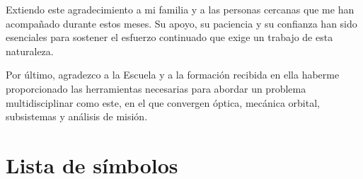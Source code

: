 Extiendo este agradecimiento a mi familia y a las personas cercanas que me han acompañado durante estos meses. Su apoyo, su paciencia y su confianza han sido esenciales para sostener el esfuerzo continuado que exige un trabajo de esta naturaleza.

Por último, agradezco a la Escuela y a la formación recibida en ella haberme proporcionado las herramientas necesarias para abordar un problema multidisciplinar como este, en el que convergen óptica, mecánica orbital, subsistemas y análisis de misión.
\clearpage


\chapter*{Lista de símbolos}
\thispagestyle{empty}

